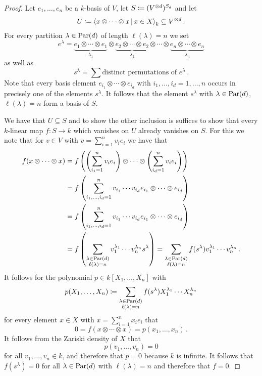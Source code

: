 \begin{proof}
  Let $e_1, \dotsc, e_n$ be a $k$-basis of $V$, let $S \coloneqq (V^{\otimes d})^{S_d}$ and let
  \[
              U
    \defined \gen{ x \otimes \dotsb \otimes x \suchthat x \in X }_k
    \subseteq V^{\otimes d} \,.
  \]
  For every partition $\lambda \in \operatorname{Par}(d)$ of length $\ell(\lambda) = n$ we set
  \[
      e^\lambda
    =         \underbrace{e_1 \otimes \dotsb \otimes e_1}_{\lambda_1}
      \otimes \underbrace{e_2 \otimes \dotsb \otimes e_2}_{\lambda_2}
      \otimes \dotsb
      \otimes \underbrace{e_n \otimes \dotsb \otimes e_n}_{\lambda_n}
  \]
  as well as
  \[
      s^\lambda
    = \sum \text{distinct permutations of $e^\lambda$} \,.
  \]
  Note that every basis element $e_{i_1} \otimes \dotsb \otimes e_{i_d}$ with $i_1, \dotsc, i_d = 1, \dotsc, n$ occurs in precisely one of the elements $s^\lambda$.
  It follows that the element $s^\lambda$ with $\lambda \in \operatorname{Par}(d)$, $\ell(\lambda) = n$ form a basis of $S$.
  
  We have that $U \subseteq S$ and to show the other inclusion is suffices to show that every $k$-linear map $f \colon S \to k$ which vanishes on $U$ already vanishes on $S$.
  For this we note that for $v \in V$ with $v = \sum_{i=1}^n v_i e_i$ we have that
  \begin{align*}
        f(x \otimes \dotsb \otimes x)
    &=  f\left(
          \left( \sum_{i_1=1}^n v_i e_i \right)
          \otimes \dotsb \otimes
          \left( \sum_{i_d=1}^n v_i e_i \right)
        \right)
    \\
    &=  f\left(
          \sum_{i_1, \dotsc, i_d = 1}^n
          v_{i_1} \dotsm v_{i_d}
          e_{i_1} \otimes \dotsb \otimes e_{i_d}
        \right)
    \\
    &=  f\left(
          \sum_{i_1, \dotsc, i_d = 1}^n
          v_{i_1} \dotsm v_{i_d}
          e_{i_1} \otimes \dotsb \otimes e_{i_d}
        \right)
    \\
    &=  f\left(
          \sum_{\substack{\lambda \in \operatorname{Par}(d) \\ \ell(\lambda) = n}}
          v_1^{\lambda_1} \dotsm v_n^{\lambda _n}
          s^\lambda
        \right)
     =  \sum_{\substack{\lambda \in \operatorname{Par}(d) \\ \ell(\lambda) = n}}
        f(s^\lambda)
        v_1^{\lambda_1} \dotsm v_n^{\lambda _n} \,.
  \end{align*}
  It follows for the polynomial $p \in k[X_1, \dotsc, X_n]$ with
  \[
              p(X_1, \dotsc, X_n)
    \coloneqq  \sum_{\substack{\lambda \in \operatorname{Par}(d) \\ \ell(\lambda) = n}}
              f( s^\lambda )
              X_1^{\lambda_1} \dotsm X_n^{\lambda_n}
  \]
  for every element $x \in X$ with $x = \sum_{i=1}^n x_i e_i$ that
  \[
      0
    = f(x \otimes \dotsb \otimes x)
    = p(x_1, \dotsc, x_n) \,.
  \]
  It follows from the Zariski density of $X$ that
  \[
      p(v_1, \dotsc, v_n)
    = 0
  \]
  for all $v_1, \dotsc, v_n \in k$, and therefore that $p = 0$ because $k$ is infinite.
  It follows that $f(s^\lambda) = 0$ for all $\lambda \in \operatorname{Par}(d)$ with $\ell(\lambda) = n$ and therefore that $f = 0$.
\end{proof}


